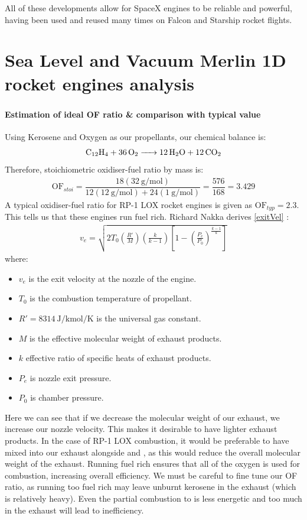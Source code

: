 \documentclass[11pt]{article}
\numberwithin{equation}{section}
\begin{document}
All of these developments allow for SpaceX engines to be reliable and powerful, having been used and reused many times on Falcon and Starship rocket flights.
\part{Sea Level and Vacuum Merlin 1D rocket engines analysis}
\section{}
\subsection{Estimation of ideal OF ratio \& comparison with typical value}
Using Kerosene and Oxygen as our propellants, our chemical balance is:
\begin{equation}
    \ce{C12H4 + 36O2 -> 12H2O + 12CO2}
\end{equation}
Therefore, stoichiometric oxidiser-fuel ratio by mass is:
\begin{gather}
    \textrm{OF}_{stoi} = \dfrac{18 (\SI{32}{\gram\per\mol})}{12(\SI{12}{\gram\per\mol}) + 24(\SI{1}{\gram\per\mol})} = \dfrac{576}{168} = 3.429
\end{gather}
A typical oxidiser-fuel ratio for RP-1 LOX rocket engines is given as $\textrm{OF}_{typ} = 2.3$. This tells us that these engines run fuel rich. Richard Nakka derives \ref{exitVel} \cite{b8}:
\begin{gather}
    v_e = \sqrt{2 T_0 \left(\frac{R'}{M}\right)\left(\frac{k}{k-1}\right)\left[1 - \left(\frac{P_e}{P_0}\right)^{\frac{k-1}{k}}\right]} \label{exitVel}
\end{gather}
where:
\begin{itemize}
    \item $v_e$ is the exit velocity at the nozzle of the engine.
    \item $T_0$ is the combustion temperature of propellant.
    \item $R' = \SI{8314}{\joule\per\kilo\mol\per\kelvin}$ is the universal gas constant.
    \item $M$ is the effective molecular weight of exhaust products.
    \item $k$ effective ratio of specific heats of exhaust products.
    \item $P_e$ is nozzle exit pressure.
    \item $P_0$ is chamber pressure.
\end{itemize}
Here we can see that if we decrease the molecular weight of our exhaust, we increase our nozzle velocity. This makes it desirable to have lighter exhaust products. In the case of RP-1 LOX combustion, it would be preferable to have  mixed into our exhaust alongside  and , as this would reduce the overall molecular weight of the exhaust. Running fuel rich ensures that all of the oxygen is used for combustion, increasing overall efficiency. We must be careful to fine tune our OF ratio, as running too fuel rich may leave unburnt kerosene in the exhaust (which is relatively heavy). Even the partial combustion to  is less energetic and too much  in the exhaust will lead to inefficiency.
\end{document}
